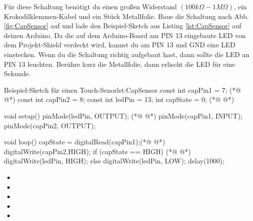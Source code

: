 Für diese Schaltung benötigt du einen großen Widerstand $(100k\Omega-1M\Omega)$, ein Krokodilklemmen-Kabel und ein Stück Metallfolie. Baue die Schaltung nach Abb. \ref{fig:CapSensor} auf und lade den Beispiel-Sketch aus Listing \ref{lst:CapSensor} auf deinen Arduino. Da die auf dem Arduino-Board am PIN 13 eingebaute LED von dem Projekt-Shield verdeckt wird, kannst du am PIN 13 und GND eine LED einstecken. Wenn du die Schaltung richtig aufgebaut hast, dann sollte die LED an PIN 13 leuchten. Berühre kurz die Metallfolie, dann erlischt die LED für eine Sekunde.   


\begin{multicols}{2}

\begin{arduinoCode}{Beispiel-Sketch für einen Touch-Senor}{lst:CapSensor}
const int capPin1 = 7;    (*@  @*) 
const int capPin2 = 8;    
const int ledPin =  13;   
int capState = 0;   (*@  @*)

void setup() {
  pinMode(ledPin, OUTPUT);  (*@  @*)
  pinMode(capPin1, INPUT);
  pinMode(capPin2, OUTPUT);
}

void loop() {
  capState = digitalRead(capPin1);(*@  @*)
  digitalWrite(capPin2,HIGH);
  if (capState == HIGH) { (*@  @*)
    digitalWrite(ledPin, HIGH);
  }
  else {
    digitalWrite(ledPin, LOW);
    delay(1000);
  } 
}
\end{arduinoCode}
\vfill
\columnbreak

\null\vfill
\begin{itemize}
  \itemsep15pt
  \item[] 
  \item[] 
  \item[] 
  \item[] 
  \item[] 
\end{itemize}
\vfill \null


\end{multicols}



